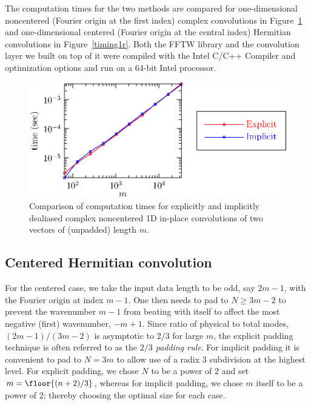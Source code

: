 \documentclass[final]{siamltex}
\begin{document}
The computation times for the two methods are compared for
one-dimensional noncentered (Fourier origin at the first index) complex
convolutions in Figure~\ref{timing1c} and one-dimensional centered (Fourier
origin at the central index) Hermitian convolutions in Figure~\ref{timing1r}.
Both the FFTW library and the convolution layer we built on top of it were
compiled with the Intel C/C++ Compiler and optimization options and run on
a 64-bit Intel processor.

\begin{figure}[htbp]
  \begin{center}
    \includegraphics{timing1c}
    \caption{Comparison of computation times for explicitly and implicitly
dealiased complex noncentered 1D in-place convolutions of two vectors of
(unpadded) length $m$.}
    \label{timing1c}
  \end{center}
\end{figure}

\subsection{Centered Hermitian convolution}

For the centered case, we take the input data length to be odd, say $2m-1$,
with the Fourier origin at index $m-1$. One then needs to pad to $N\ge 3m-2$
to prevent the wavenumber $m-1$ from beating with itself to affect the most
negative (first) wavenumber, $-m+1$. Since ratio of physical to total modes,
$(2m-1)/(3m-2)$ is asymptotic to $2/3$ for large $m$, the explicit padding
technique is often referred to as the {\it $2/3$ padding rule}. 
For implicit padding it is convenient to pad to $N=3m$ to allow use of a
radix $3$ subdivision at the highest level. For explicit padding, we chose
$N$ to be a power of $2$ and
set $m=\floor{(n+2)/3}$, whereas for implicit padding, we chose $m$ itself
to be a power of $2$; thereby choosing the optimal size for each case.
\end{document}
